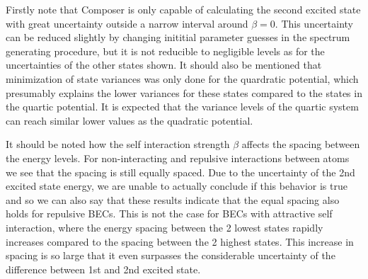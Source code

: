 \documentclass[a4paper, twocolumn]{revtex4-1}
\begin{document}
Firstly note that Composer is only capable of calculating the second excited state with great uncertainty outside a narrow interval around $\beta = 0$. This uncertainty can be reduced slightly by changing inititial parameter guesses in the spectrum generating procedure, but it is not reducible to negligible levels as for the uncertainties of the other states shown. It should also be mentioned that minimization of state variances was only done for the quardratic potential, which presumably explains the lower variances for these states compared to the states in the quartic potential. It is expected that the variance levels of the quartic system can reach similar lower values as the quadratic potential.

It should be noted how the self interaction strength $\beta$ affects the spacing between the energy levels. For non-interacting and repulsive interactions between atoms we see that the spacing is still equally spaced. Due to the uncertainty of the 2nd excited state energy, we are unable to actually conclude if this behavior is true and so we can also say that these results indicate that the equal spacing also holds for repulsive BECs. This is not the case for BECs with attractive self interaction, where the energy spacing between the 2 lowest states rapidly increases compared to the spacing between the 2 highest states. This increase in spacing is so large that it even surpasses the considerable uncertainty of the difference between 1st and 2nd excited state. \\
\end{document}
